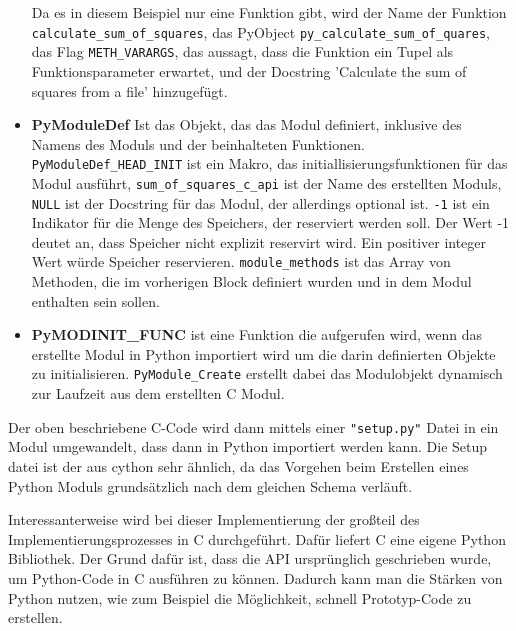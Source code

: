 \documentclass[a4paper, parskip=half]{scrartcl}
\begin{document}
\begin{itemize}
    Da es in diesem Beispiel nur eine Funktion gibt, wird der Name der Funktion 
    \\\lstinline{calculate_sum_of_squares}, das PyObject \lstinline{py_calculate_sum_of_quares}, das Flag \lstinline{METH_VARARGS}, das aussagt, dass die Funktion ein Tupel als Funktionsparameter erwartet, und der Docstring 'Calculate the sum of squares from a file' hinzugefügt. \cite{c_api_module}
    \item \textbf{PyModuleDef} Ist das Objekt, das das Modul definiert, inklusive des Namens des Moduls und der beinhalteten Funktionen. \lstinline{PyModuleDef_HEAD_INIT} ist ein Makro, das initiallisierungsfunktionen für das Modul ausführt, \lstinline{sum_of_squares_c_api} ist der Name des erstellten Moduls, \lstinline{NULL} ist der Docstring für das Modul, der allerdings optional ist. \lstinline{-1} ist ein Indikator für die Menge des Speichers, der reserviert werden soll. Der Wert -1 deutet an, dass Speicher nicht explizit reservirt wird. Ein positiver integer Wert würde Speicher reservieren. \lstinline{module_methods} ist das Array von Methoden, die im vorherigen Block definiert wurden und in dem Modul enthalten sein sollen. \cite{c_api_module}
    \item \textbf{PyMODINIT\_FUNC} ist eine Funktion die aufgerufen wird, wenn das erstellte Modul in Python importiert wird um die darin definierten Objekte zu initialisieren. \lstinline{PyModule_Create} erstellt dabei das Modulobjekt dynamisch zur Laufzeit aus dem erstellten C Modul. \cite{c_api_init}
\end{itemize}

Der oben beschriebene C-Code wird dann mittels einer \lstinline{"setup.py"} Datei in ein Modul umgewandelt, dass dann in Python importiert werden kann. Die Setup datei ist der aus cython sehr ähnlich, da das Vorgehen beim Erstellen eines Python Moduls grundsätzlich nach dem gleichen Schema verläuft.  





Interessanterweise wird bei dieser Implementierung der großteil des Implementierungsprozesses in C durchgeführt. Dafür liefert C eine eigene Python Bibliothek. Der Grund dafür ist, dass die API ursprünglich geschrieben wurde, um Python-Code in C ausführen zu können. Dadurch kann man die Stärken von Python nutzen, wie zum Beispiel die Möglichkeit, schnell Prototyp-Code zu erstellen.
\end{document}
